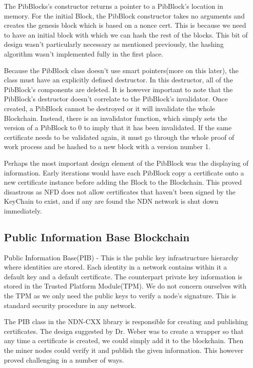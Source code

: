 The PibBlocks's constructor returns a pointer to a PibBlock's location in memory. For the initial Block, the PibBlock constructor takes no arguments and creates the genesis block which is based on a nonce cert. This is because we need to have an initial block with which we can hash the rest of the blocks. This bit of design wasn't particularly necessary as mentioned previously, the hashing algorithm wasn't implemented fully in the first place. 

Because the PibBlock class doesn't use smart pointers(more on this later), the class must have an explicitly defined destructor. In this destructor, all of the PibBlock's components are deleted. It is however important to note that the PibBlock's destructor doesn't correlate to the PibBlock's invalidator. Once created, a PibBlock cannot be destroyed or it will invalidate the whole Blockchain. Instead, there is an invalidator function, which simply sets the version of a PibBlock to 0 to imply that it has been invalidated. If the same certificate needs to be validated again, it must go through the whole proof of work process and be hashed to a new block with a version number 1.

Perhaps the most important design element of the PibBlock was the displaying of information. Early iterations would have each PibBlock copy a certificate onto a new certificate instance before adding the Block to the Blockchain. This proved disastrous as NFD does not allow certificates that haven't been signed by the KeyChain to exist, and if any are found the NDN network is shut down immediately.
\subsection{Public Information Base Blockchain}

Public Information Base(PIB) - This is the public key infrastructure hierarchy where identities are stored. Each identity in a network contains within it a default key and a default certificate. The counterpart private key information is stored in the Trusted Platform Module(TPM). We do not concern ourselves with the TPM as we only need the public keys to verify a node's signature. This is standard security procedure in any network. 

The PIB class in the NDN-CXX library is responsible for creating and publishing certificates. The design suggested by Dr. Weber was to create a wrapper so that any time a certificate is created, we could simply add it to the blockchain. Then the miner nodes could verify it and publish the given information. This however proved challenging in a number of ways. 

